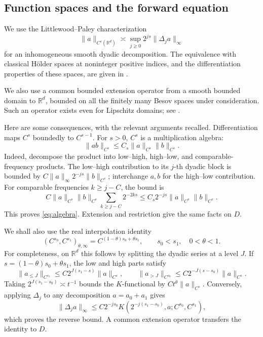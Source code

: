 \documentclass[11pt]{article}
\theoremstyle{remark}
\newcommand{\R}{\mathbb R}
\begin{document}
\subsection{Function spaces and the forward equation}

We use the Littlewood--Paley characterization
\begin{equation}\label{eq:LP}
\|a\|_{C^s(\R^d)}
\asymp \sup_{j\geq0}2^{js}\|\Delta_j a\|_\infty
\end{equation}
for an inhomogeneous smooth dyadic decomposition. The equivalence with
classical H\"older spaces at noninteger positive indices, and the
differentiation properties of these spaces, are given in
\cite[Chapter~13, Section~8]{Taylor}.

We also use a common bounded extension operator from a smooth bounded
domain to \(\R^d\), bounded on all the finitely many Besov spaces under
consideration. Such an operator exists even for Lipschitz domains;
see \cite{Rychkov}.

Here are some consequences, with the relevant arguments recalled.
Differentiation maps \(C^s\) boundedly to \(C^{s-1}\).
For \(s>0\), \(C^s\) is a multiplication algebra:
\begin{equation}\label{eq:algebra}
\|ab\|_{C^s}\leq C_s\|a\|_{C^s}\|b\|_{C^s}.
\end{equation}
Indeed, decompose the product into low--high, high--low, and
comparable-frequency products. The low--high contribution to its
\(j\)-th dyadic block is bounded by
\(C\|a\|_\infty 2^{-js}\|b\|_{C^s}\); interchange \(a,b\) for
the high--low contribution. For comparable frequencies \(k\geq j-C\),
the bound is
\[
C\|a\|_{C^s}\|b\|_{C^s}
\sum_{k\geq j-C}2^{-2ks}
\leq C_s2^{-js}\|a\|_{C^s}\|b\|_{C^s}.
\]
This proves \eqref{eq:algebra}. Extension and restriction give the same
facts on \(D\).

We shall also use the real interpolation identity
\begin{equation}\label{eq:interp}
(C^{s_0},C^{s_1})_{\theta,\infty}
=C^{(1-\theta)s_0+\theta s_1},
\qquad s_0<s_1,\quad 0<\theta<1.
\end{equation}
For completeness, on \(\R^d\) this follows by splitting the dyadic
series at a level \(J\). If \(s=(1-\theta)s_0+\theta s_1\), the low
and high parts satisfy
\[
\|a_{\leq J}\|_{C^{s_1}}
\leq C2^{J(s_1-s)}\|a\|_{C^s},\qquad
\|a_{>J}\|_{C^{s_0}}
\leq C2^{-J(s-s_0)}\|a\|_{C^s}.
\]
Taking \(2^{J(s_1-s_0)}\asymp t^{-1}\) bounds the \(K\)-functional
by \(Ct^\theta\|a\|_{C^s}\). Conversely, applying \(\Delta_j\) to
any decomposition \(a=a_0+a_1\) gives
\[
\|\Delta_j a\|_\infty
\leq C2^{-js_0}
K(2^{-j(s_1-s_0)},a;C^{s_0},C^{s_1}),
\]
which proves the reverse bound. A common extension operator transfers
the identity to \(D\).
\end{document}
